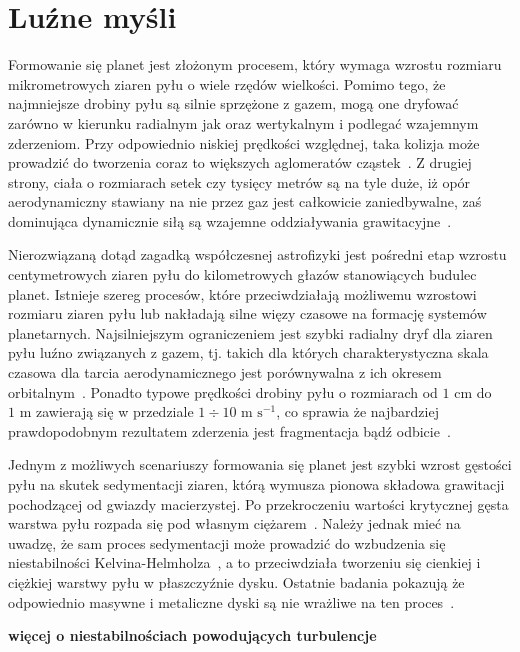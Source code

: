 \section{Luźne myśli}

Formowanie się planet jest złożonym procesem, który wymaga wzrostu rozmiaru
mikrometrowych ziaren pyłu o wiele rzędów wielkości. Pomimo tego, że najmniejsze
drobiny pyłu są silnie sprzężone z gazem, mogą one dryfować zarówno w kierunku
radialnym jak oraz wertykalnym i podlegać wzajemnym zderzeniom. Przy odpowiednio
niskiej prędkości względnej, taka kolizja może prowadzić do tworzenia coraz to
większych aglomeratów cząstek~\citep{BW08}. Z drugiej strony, ciała o rozmiarach
setek czy tysięcy metrów są na tyle duże, iż opór aerodynamiczny stawiany na nie
przez gaz jest całkowicie zaniedbywalne, zaś dominująca dynamicznie siłą są
wzajemne oddziaływania grawitacyjne~\citep{KKI06}.

\par Nierozwiązaną dotąd zagadką współczesnej astrofizyki jest pośredni etap
wzrostu centymetrowych ziaren pyłu do kilometrowych głazów stanowiących budulec
planet. Istnieje szereg procesów, które przeciwdziałają możliwemu wzrostowi
rozmiaru ziaren pyłu lub nakładają silne więzy czasowe na formację systemów
planetarnych. Najsilniejszym ograniczeniem jest szybki radialny dryf dla ziaren
pyłu luźno związanych z gazem, tj. takich dla których charakterystyczna skala
czasowa dla tarcia aerodynamicznego jest porównywalna z ich okresem
orbitalnym~\citep{W77}. Ponadto typowe prędkości drobiny pyłu o rozmiarach od
$1\textrm{ cm}$ do $1\textrm{ m}$ zawierają się w przedziale $1\div10\textrm{ m
s}^{-1}$, co sprawia że najbardziej prawdopodobnym rezultatem zderzenia jest
fragmentacja bądź odbicie~\citep{Z10}.

\par Jednym z możliwych scenariuszy formowania się planet jest szybki wzrost
gęstości pyłu na skutek sedymentacji ziaren, którą wymusza pionowa składowa
grawitacji pochodzącej od gwiazdy macierzystej. Po przekroczeniu wartości
krytycznej gęsta warstwa pyłu rozpada się pod własnym ciężarem~\citep{GW73}.
Należy jednak mieć na uwadzę, że sam proces sedymentacji może prowadzić do
wzbudzenia się niestabilności Kelvina-Helmholza~\cite{JHK06}, a to przeciwdziała
tworzeniu się cienkiej i ciężkiej warstwy pyłu w płaszczyźnie dysku. Ostatnie
badania pokazują że odpowiednio masywne i metaliczne dyski są nie wrażliwe na
ten proces~\citep{L10}.

{\bf więcej o niestabilnościach powodujących turbulencje}

